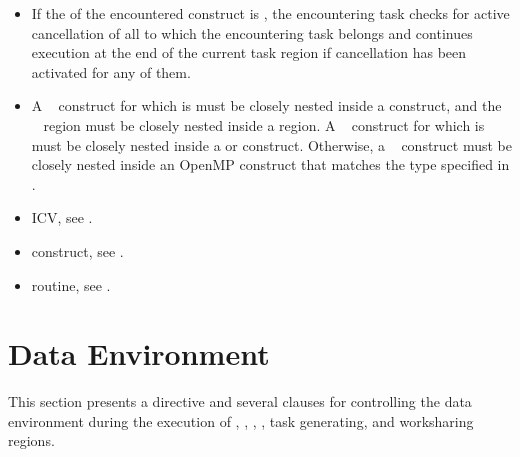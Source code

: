 {{{{\begin{itemize}
\item If the  of the encountered 
 construct is , the encountering 
task checks for active cancellation of all   to which the 
encountering task belongs and continues execution at the end of the current 
task region if cancellation has been activated for any of them.
\end{itemize}

\restrictions
\begin{itemize}
\item A ~ construct for which
 is  must be closely nested
inside a  construct, and the ~
region must be closely nested inside a  region. A
~ construct for which
 is  must be closely nested
inside a  or  construct. Otherwise, a
~ construct must be closely nested inside
an OpenMP construct that matches the type specified in
.
\end{itemize}

\begin{samepage}
\crossreferences
\begin{itemize}
\item {} ICV, see
.

\item {} construct, see 
.

\item {} routine, see 
.
\end{itemize}
\end{samepage}









\section{Data Environment}
\label{sec:Data Environment}
This section presents a directive and several clauses for controlling the data environment 
during the execution of , , , , task generating, and worksharing regions.

}}}}
